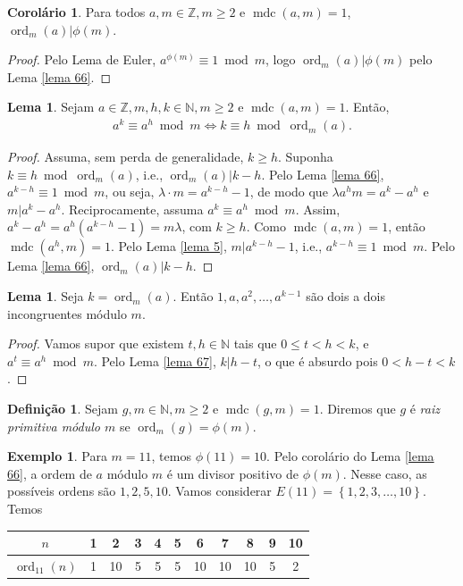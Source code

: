 \documentclass[a4paper,11pt,twoside, leqno]{article}
\DeclareMathOperator{\mdc}{mdc}
\DeclareMathOperator{\Ord}{ord}
\theoremstyle{definition}
\newtheorem*{definition}{Definição}
\newtheorem{corollary}{Corolário}[theorem]
\newtheorem{lemma}[theorem]{Lema}
\newtheorem*{example}{Exemplo}
\begin{document}
\begin{corollary}
	Para todos $a,m\in\mathbb{Z}, m\geq 2$ e $\mdc(a,m) = 1$, $\Ord_m(a)|\phi(m)$.
\end{corollary}
\begin{proof}
	Pelo Lema de Euler, $a^{\phi(m)}\equiv 1\bmod m$, logo $\Ord_m(a)|\phi(m)$ pelo Lema \eqref{lema 66}.
\end{proof}
\begin{lemma}
	\label{lema 67}
	Sejam $a\in\mathbb{Z}, m,h,k\in\mathbb{N}, m\geq 2$ e $\mdc(a,m) = 1$. Então,
	\begin{align*}
	a^k\equiv a^h\bmod m\Leftrightarrow k\equiv h\bmod \Ord_m(a).
	\end{align*}
\end{lemma}
\begin{proof}
	Assuma, sem perda de generalidade, $k\geq h$. Suponha $k\equiv h\bmod\Ord_m(a)$, i.e., $\Ord_m(a)|k-h$. Pelo Lema \eqref{lema 66}, $a^{k-h}\equiv 1\bmod m$, ou seja, $\lambda\cdot m = a^{k-h} - 1$, de modo que $\lambda a^hm = a^k - a^h$ e $m|a^k - a^h$. Reciprocamente, assuma $a^k\equiv a^h\bmod m$. Assim, $a^k - a^h = a^h(a^{k-h} - 1) = m\lambda$, com $k\geq h$. Como $\mdc(a,m) = 1$, então $\mdc(a^h,m) = 1$. Pelo Lema \eqref{lema 5}, $m|a^{k-h} - 1$, i.e., $a^{k-h}\equiv 1\bmod m$. Pelo Lema \eqref{lema 66}, $\Ord_m(a)|k-h.$
\end{proof}
\begin{lemma}
	\label{lema 68}
	Seja $k = \Ord_m(a)$. Então $1,a,a^2,\dots,a^{k-1}$ são dois a dois incongruentes módulo $m$.
\end{lemma}
\begin{proof}
	Vamos supor que existem $t,h\in\mathbb{N}$ tais que $0\leq t<h<k$, e $a^t\equiv a^h\bmod m$. Pelo Lema \eqref{lema 67}, $k|h-t$, o que é absurdo pois $0 < h-t < k$.
\end{proof}
\begin{definition}
	Sejam $g,m\in\mathbb{N}, m\geq 2$ e $\mdc(g,m) = 1$. Diremos que $g$ é {\em raiz primitiva módulo $m$} se $\Ord_m(g) = \phi(m)$.
\end{definition}
\begin{example}
	Para $m=11$, temos $\phi(11) = 10$. Pelo corolário do Lema \eqref{lema 66}, a ordem de $a$ módulo $m$ é um divisor positivo de $\phi(m)$. Nesse caso, as possíveis ordens são $1,2,5,10$. Vamos considerar $E(11) = \left\{ 1,2,3,\dots,10 \right\}$. Temos
	\begin{table}[H]
		\centering 
		\begin{tabular}{c|c|c|c|c|c|c|c|c|c|c}
			$n$ & 1 & 2 & 3 & 4 & 5 & 6 & 7 & 8 & 9 & 10 \\
			\hline
			$\Ord_{11}(n)$ & 1 & 10 & 5 & 5 & 5 & 10 & 10 & 10 & 5 & 2
		\end{tabular}
	\end{table} 
\end{example}
\end{document}
